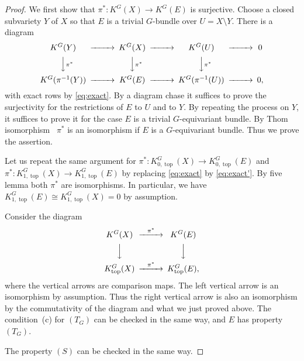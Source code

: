 \documentclass[12pt]{amsart}
\theoremstyle{definition}
\theoremstyle{remark}
\numberwithin{equation}{subsection}
\newcommand{\Ktop}{K_{\operatorname{top}}}
\newcommand{\Kztop}{K_{0,\operatorname{top}}}
\newcommand{\Kotop}{K_{1,\operatorname{top}}}
\begin{document}
\begin{proof}
We first show that $\pi^*\colon K^G(X) \to K^G(E)$ is
surjective. Choose a closed subvariety $Y$ of $X$ so that $E$ is a
trivial $G$-bundle over $U = X\setminus Y$. There is a diagram
\begin{equation*}
\begin{CD}
   K^G(Y) @>>> K^G(X) @>>> K^G(U) @>>> 0 \\
    @VV{\pi^*}V       @VV{\pi^*}V        @VV{\pi^*}V  \\
   K^G(\pi^{-1}(Y)) @>>> K^G(E) @>>> K^G(\pi^{-1}(U)) @>>> 0,
\end{CD}
\end{equation*}
with exact rows by \eqref{eq:exact}.
%
By a diagram chase it suffices to prove the surjectivity for the
restrictions of $E$ to $U$ and to $Y$. By repeating the process on
$Y$, it suffices to prove it for the case $E$ is a trivial
$G$-equivariant bundle.
%
By Thom isomorphism~\cite[4.1]{Thom} $\pi^*$ is an isomorphism if $E$
is a $G$-equivariant bundle. Thus we prove the assertion.

Let us repeat the same argument for $\pi^*\colon \Kztop^G(X)\to
\Kztop^G(E)$ and $\pi^*\colon \Kotop^G(X)\to \Kotop^G(E)$ by replacing
\eqref{eq:exact} by \eqref{eq:exact'}. By five lemma both $\pi^*$ are
isomorphisms.
%
In particular, we have $\Kotop^G(E) \cong \Kotop^G(X) = 0$ by
assumption.

Consider the diagram
\begin{equation*}
\begin{CD}
   K^G(X) @>\pi^*>> K^G(E) \\
   @VVV             @VVV \\
   \Ktop^G(X) @>\pi^*>> \Ktop^G(E),
\end{CD}
\end{equation*}
where the vertical arrows are comparison maps.
%
The left vertical arrow is an isomorphism by assumption. Thus the
right vertical arrow is also an isomorphism by the commutativity of
the diagram and what we just proved above. The condition~(c) for
$(T_G)$ can be checked in the same way, and $E$ has property $(T_G)$.

The property $(S)$ can be checked in the same way.
\end{proof}
\end{document}
